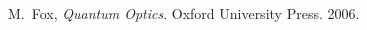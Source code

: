 \begin{thebibliography}{9}

  M.~Fox,
  \emph{Quantum Optics}.
  Oxford University Press.
  2006.
  
  \end{thebibliography}